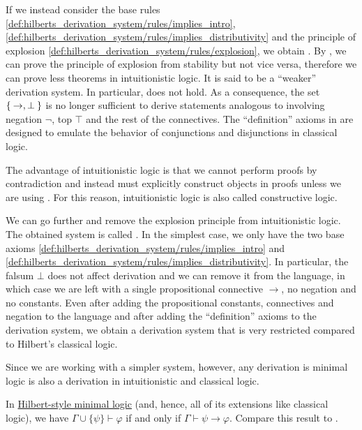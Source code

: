 \begin{remark}
\begin{RemEnum}
    If we instead consider the base rules \eqref{def:hilberts_derivation_system/rules/implies_intro}, \eqref{def:hilberts_derivation_system/rules/implies_distributivity} and the principle of explosion \eqref{def:hilberts_derivation_system/rules/explosion}, we obtain . By , we can prove the principle of explosion from stability but not vice versa, therefore we can prove less theorems in intuitionistic logic. It is said to be a \enquote{weaker} derivation system. In particular,  does not hold. As a consequence, the set \( \Set{ \rightarrow, \bot } \) is no longer sufficient to derive statements analogous to  involving negation \( \neg \), top \( \top \) and the rest of the connectives. The \enquote{definition} axioms in  are designed to emulate the behavior of conjunctions and disjunctions in classical logic.

    The advantage of intuitionistic logic is that we cannot perform proofs by contradiction and instead must explicitly construct objects in proofs unless we are using . For this reason, intuitionistic logic is also called constructive logic.

     We can go further and remove the explosion principle from intuitionistic logic. The obtained system is called . In the simplest case, we only have the two base axioms \eqref{def:hilberts_derivation_system/rules/implies_intro} and \eqref{def:hilberts_derivation_system/rules/implies_distributivity}. In particular, the falsum \( \bot \) does not affect derivation and we can remove it from the language, in which case we are left with a single propositional connective \( \rightarrow \), no negation and no constants. Even after adding the propositional constants, connectives and negation to the language and after adding the \enquote{definition} axioms to the derivation system, we obtain a derivation system that is very restricted compared to Hilbert's classical logic.

    Since we are working with a simpler system, however, any derivation is minimal logic is also a derivation in intuitionistic and classical logic.
  \end{RemEnum}
\end{remark}

\begin{theorem}\label{thm:deduction_theorem}
  In \hyperref[rem:hilberts_derivation_system_axioms/minimal]{Hilbert-style minimal logic} (and, hence, all of its extensions like classical logic), we have \( \Gamma \cup \{ \psi \} \vdash \varphi \) if and only if \( \Gamma \vdash \psi \rightarrow \varphi \). Compare this result to .
\end{theorem}
